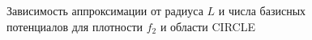 \documentclass[a4paper, 12pt]{article}
\begin{document}
      \begin{figure}[h!]
        \noindent{}
        \caption{Зависимость аппроксимации от радиуса $L$ и числа базисных потенциалов для плотности $f_2$ и области CIRCLE}
        \label{nolnol}
        \end{figure} 
  
\end{document}
